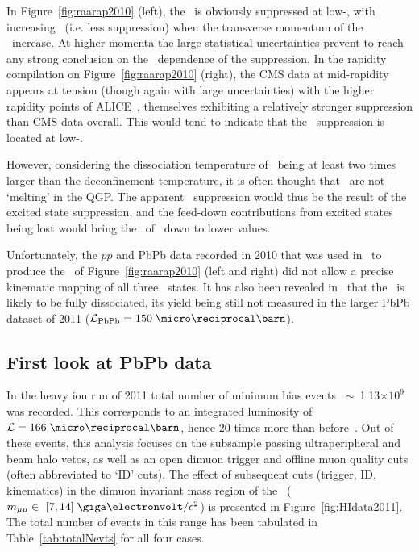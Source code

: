 In Figure~\ref{fig:raarap2010} (left), the \PgUa\ is obviously suppressed at low-\pt, with
increasing \RAA\ (i.e. less suppression) when the transverse momentum of the \PgUa\
increase. At higher momenta the large statistical uncertainties prevent to reach any strong conclusion on the \pt\ dependence of the suppression. In the rapidity compilation on Figure~\ref{fig:raarap2010} (right), the CMS data at
mid-rapidity appears at tension (though again with large uncertainties) with the higher rapidity points of ALICE~\cite{ALICEUpsilonHI}, themselves exhibiting a relatively stronger suppression than CMS data overall. This would tend to indicate that the \PgU\
suppression is located at low-\pt. 

However, considering
the dissociation temperature of \PgUa\ being at least two times larger
than the deconfinement temperature, it is often thought that \PgUa\
are not `melting' in the QGP. The apparent \PgUa\ suppression would thus be
the result of the excited state suppression, and the feed-down
contributions from excited states being lost would bring the
\RAA\ of \PgUa\ down to lower values.

Unfortunately, the $pp$ and PbPb data recorded in 2010 that was
used in~\cite{torsten} to produce the \RAA\ of
Figure~\ref{fig:raarap2010} (left and right) did not allow a
precise kinematic mapping of all three \PgU\ states. It has also been revealed in~\cite{HIN-11-007} that the \PgUc\ is likely to be
fully dissociated, its yield being still not measured in the larger
PbPb dataset of 2011 ($\mathcal{L_{\rm PbPb}} = 150 \;
\invmub$). 

\subsection{First look at PbPb data}

In the heavy ion run of 2011 total number of minimum bias
events \NMB~$\sim$~1.13$\times 10^{9}$ was recorded. This corresponds to
an integrated luminosity of $\mathcal{L} = 166 \;
\invmub$, hence 20 times more than before~\cite{torsten}. Out of these events, this analysis focuses on the
subsample passing ultraperipheral and beam halo vetos, as well as
 an open dimuon trigger and offline muon quality cuts (often
abbreviated to `ID' cuts). The effect of subsequent cuts (trigger, ID, kinematics)
in the dimuon invariant mass region of the \PgU\ ($m_{\mu\mu}
\in~[7,14] \; \unitMass$) is presented in
Figure~\ref{fig:HIdata2011}. The total number of events in this range has been
tabulated in Table~\ref{tab:totalNevts} for all four cases.


